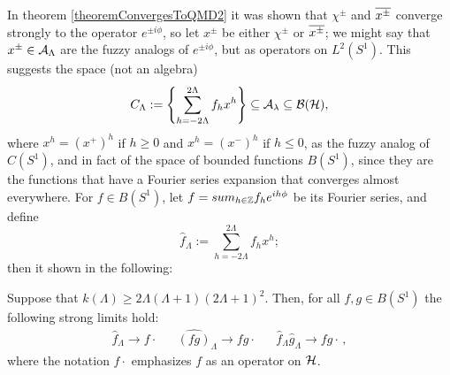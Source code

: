 In theorem \ref{theoremConvergesToQMD2} it was shown that $\chi^\pm$ and $\overline{x^\pm}$ converge strongly to the operator $e^{\pm i\phi}$, so let $x^\pm$ be either $\chi^\pm$ or $\overline{x^\pm}$; we might say that $x^\pm \in \mathcal A_\Lambda$ are the fuzzy analogs of $e^{\pm i\phi}$, but as operators on $L^2(S^1)$. This suggests \cite{Fiore2018} the space (not an algebra)
\begin{equation}
    C_\Lambda := \left\{ \sum_{h = -2\Lambda}^{2\Lambda} f_h x^h \right\} \subseteq \mathcal A_\lambda \subseteq \mathcal B(\mathcal H),
\end{equation}
where $x^h = (x^+)^h$ if $h \geq 0$ and $x^h = (x^-)^h$ if $h \leq 0$, as the fuzzy analog of $C(S^1)$, and in fact of the space of bounded functions $B(S^1)$, since they are the functions that have a Fourier series expansion that converges almost everywhere. For $f \in B(S^1)$, let $f = sum_{h \in \ZZ} f_h e^{ih\phi}$ be its Fourier series, and define
\begin{equation}
    \hat f_\Lambda := \sum_{h = -2\Lambda}^{2\Lambda} f_h x^h;
\end{equation}
then it shown in \cite{Fiore2018} the following:

\begin{theorem}\label{theoremConvergesFuzzyCircleD2}
Suppose that $k(\Lambda) \geq 2\Lambda(\Lambda+1)(2\Lambda+1)^2$. Then, for all $f, g \in B(S^1)$ the following strong limits hold:
\begin{align}
    \hat f_\Lambda \to f\cdot && \hat{(fg)}_\Lambda \to fg\cdot && \hat f_\Lambda \hat g_\Lambda \to fg \cdot\,,
\end{align}
where the notation $f\cdot$ emphasizes $f$ as an operator on $\mathcal H$.
\end{theorem}



    
    
